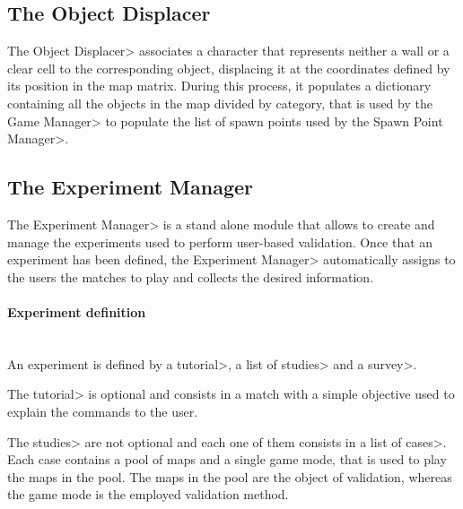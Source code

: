 
\subsection{The Object Displacer}

The \<Object Displacer> associates a character that represents neither a wall or a clear cell to the corresponding object, displacing it at the coordinates defined by its position in the map matrix. During this process, it populates a dictionary containing all the objects in the map divided by category, that is used by the \<Game Manager> to populate the list of spawn points used by the \<Spawn Point Manager>.


\subsection{The Experiment Manager}

The \<Experiment Manager> is a stand alone module that allows to create and manage the experiments used to perform user-based validation. Once that an experiment has been defined, the \<Experiment Manager> automatically assigns to the users the matches to play and collects the desired information.

\paragraph{Experiment definition}

\mbox{}\\

{\setlength{\parindent}{0cm}
An experiment is defined by a \<tutorial>, a list of \<studies> and a \<survey>.}

\par

The \<tutorial> is optional and consists in a match with a simple objective used to explain the commands to the user.

\par

The \<studies> are not optional and each one of them consists in a list of \<cases>. Each case contains a pool of maps and a single game mode, that is used to play the maps in the pool. The maps in the pool are the object of validation, whereas the game mode is the employed validation method.

\par

